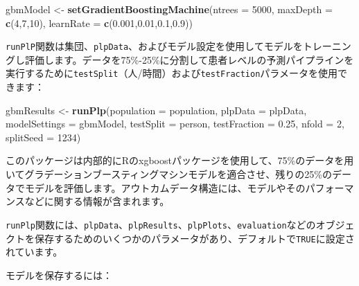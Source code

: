 \documentclass[
  11pt]{book}
\newenvironment{Shaded}{\begin{snugshade}}{\end{snugshade}}
\newcommand{\AttributeTok}[1]{\textcolor[rgb]{0.13,0.29,0.53}{#1}}
\newcommand{\DecValTok}[1]{\textcolor[rgb]{0.00,0.00,0.81}{#1}}
\newcommand{\FloatTok}[1]{\textcolor[rgb]{0.00,0.00,0.81}{#1}}
\newcommand{\FunctionTok}[1]{\textcolor[rgb]{0.13,0.29,0.53}{\textbf{#1}}}
\newcommand{\NormalTok}[1]{#1}
\newcommand{\OtherTok}[1]{\textcolor[rgb]{0.56,0.35,0.01}{#1}}
\newcommand{\StringTok}[1]{\textcolor[rgb]{0.31,0.60,0.02}{#1}}
\theoremstyle{definition}
\theoremstyle{definition}
\theoremstyle{definition}
\theoremstyle{definition}
\theoremstyle{remark}
\begin{document}
\begin{Shaded}
\begin{Highlighting}[]
\NormalTok{gbmModel }\OtherTok{\textless{}{-}} \FunctionTok{setGradientBoostingMachine}\NormalTok{(}\AttributeTok{ntrees =} \DecValTok{5000}\NormalTok{,}
                                       \AttributeTok{maxDepth =} \FunctionTok{c}\NormalTok{(}\DecValTok{4}\NormalTok{,}\DecValTok{7}\NormalTok{,}\DecValTok{10}\NormalTok{),}
                                       \AttributeTok{learnRate =} \FunctionTok{c}\NormalTok{(}\FloatTok{0.001}\NormalTok{,}\FloatTok{0.01}\NormalTok{,}\FloatTok{0.1}\NormalTok{,}\FloatTok{0.9}\NormalTok{))}
\end{Highlighting}
\end{Shaded}

\texttt{runPlP}関数は集団、\texttt{plpData}、およびモデル設定を使用してモデルをトレーニングし評価します。データを75\%-25\%に分割して患者レベルの予測パイプラインを実行するために\texttt{testSplit}（人/時間）および\texttt{testFraction}パラメータを使用できます：

\begin{Shaded}
\begin{Highlighting}[]
\NormalTok{gbmResults }\OtherTok{\textless{}{-}} \FunctionTok{runPlp}\NormalTok{(}\AttributeTok{population =}\NormalTok{ population,}
                     \AttributeTok{plpData =}\NormalTok{ plpData,}
                     \AttributeTok{modelSettings =}\NormalTok{ gbmModel,}
                     \AttributeTok{testSplit =} \StringTok{\textquotesingle{}person\textquotesingle{}}\NormalTok{,}
                     \AttributeTok{testFraction =} \FloatTok{0.25}\NormalTok{,}
                     \AttributeTok{nfold =} \DecValTok{2}\NormalTok{,}
                     \AttributeTok{splitSeed =} \DecValTok{1234}\NormalTok{)}
\end{Highlighting}
\end{Shaded}

このパッケージは内部的にRのxgboostパッケージを使用して、75\%のデータを用いてグラデーションブースティングマシンモデルを適合させ、残りの25\%のデータでモデルを評価します。アウトカムデータ構造には、モデルやそのパフォーマンスなどに関する情報が含まれます。

\texttt{runPlp}関数には、\texttt{plpData}、\texttt{plpResults}、\texttt{plpPlots}、\texttt{evaluation}などのオブジェクトを保存するためのいくつかのパラメータがあり、デフォルトで\texttt{TRUE}に設定されています。

モデルを保存するには：
\end{document}

